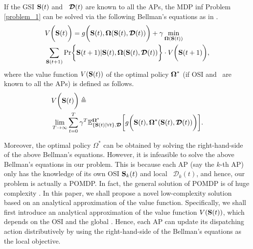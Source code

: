 If the GSI $\mathbf{S}(t)$ and \brlatency~$\boldsymbol{\mathcal{D}}(t)$ are known to all the APs, the MDP inf Problem \ref{problem_1} can be solved via the following Bellman's equations as in \cite{sutton1998}.
\begin{align}
    &V\Paren{\Stat(t)} =g\Paren{\Stat(t), \Policy(\Stat(t), \Delay(t))}
        + \gamma \min_{\Policy(\Stat(t))}
        \nonumber\\
        &\sum_{\Stat(t+1)} \Pr\Brace{ \Stat(t+1)|\Stat(t), \Policy(\Stat(t), \Delay(t)) } \cdot V\Paren{\Stat(t+1)},
    \label{eqn:sp_0}
\end{align}
where the value function $V(\mathbf{S}(t))$ of the optimal policy $\boldsymbol{\Omega}^{*}$ (if OSI and \brlatency~are known to all the APs) is defined as follows.
\begin{align}
    &V\bigg(\mathbf{S}(t)\bigg) \triangleq
    \nonumber\\
    &\lim_{T\to\infty} \sum_{t=0}^{T} \gamma^{T}
    \mathbb{E}^{\boldsymbol{\Omega}^*}_{\{\mathbf{S}(t)|\forall t\}, \boldsymbol{\mathcal{D}}} \bigg[
        g\bigg( \mathbf{S}(t), \boldsymbol{\Omega}^{*}(\mathbf{S}(t), \boldsymbol{\mathcal{D}}(t)) \bigg)
    \bigg].
    \label{eqn:val_f}
\end{align}

Moreover, the optimal policy $\Omega^{*}$ can be obtained by solving the right-hand-side of the above Bellman's equations.
However, it is infeasible to solve the above Bellman's equations in our problem.
This is because each AP (say the $k$-th AP) only has the knowledge of its own OSI $\mathbf{S}_{k}(t)$ and local \brlatency~$\mathcal{D}_{k}(t)$, and hence, our problem is actually a POMDP.
In fact, the general solution of POMDP is of huge complexity \cite{IJCAI03-NairR,IJCAI99-BoutilierC}.
In this paper, we shall propose a novel low-complexity solution based on an analytical approximation of the value function.
Specifically, we shall first introduce an analytical approximation of the value function $V(\mathbf{S}(t))$, which depends on the OSI and the global \brlatency.
Hence, each AP can update its dispatching action distributively by using the right-hand-side of the Bellman's equations as the local objective.
